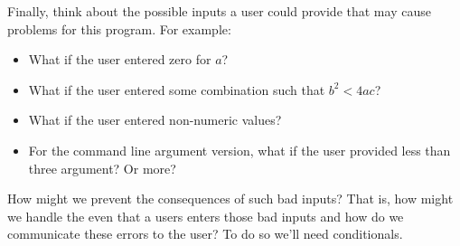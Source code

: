 Finally, think about the possible inputs a user could provide that may cause problems
for this program.  For example:
\begin{itemize}
  \item What if the user entered zero for $a$?
  \item What if the user entered some combination such that $b^2 < 4ac$?
  \item What if the user entered non-numeric values?
  \item For the command line argument version, what if the user provided less than
  	three argument?  Or more?
\end{itemize}
How might we prevent the consequences of such bad inputs?  That is, 
how might we handle the even that a users enters those bad inputs and
how do we communicate these errors to the user?  To do so we'll need 
conditionals.




